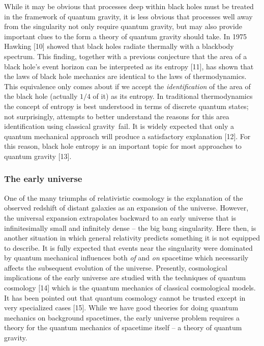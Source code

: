 While it may be obvious that processes deep within black holes must be
treated in the framework of quantum gravity, it is less obvious that
processes well away from the singularity not only require quantum gravity,
but may also provide important clues to the form a theory of quantum gravity
should take. In 1975 Hawking [10] showed that black holes radiate thermally
with a blackbody spectrum. This finding, together with a previous conjecture
that the area of a black hole's event horizon can be interpreted as its
entropy [11], has shown that the laws of black hole mechanics are identical
to the laws of thermodynamics. This equivalence only comes about if we
accept the {\it identification} of the area of the black hole (actually $1/4$
of it) as its entropy. In traditional thermodynamics the concept of entropy
is best understood in terms of discrete quantum states; not surprisingly,
attempts to better understand the reasons for this area identification using
classical gravity{\it \ }fail. It is widely expected that only a quantum
mechanical approach will produce a satisfactory explanation [12]. For this
reason, black hole entropy is an important topic for most approaches to
quantum gravity [13].

\subsubsection{The early universe}

One of the many triumphs of relativistic cosmology is the explanation of the
observed redshift of distant galaxies as an expansion of the universe.
However, the universal expansion extrapolates backward to an early universe
that is infinitesimally small and infinitely dense -- the big bang
singularity. Here then, is another situation in which general relativity
predicts something it is not equipped to describe. It is fully expected that
events near the singularity were dominated by quantum mechanical influences
both {\it of} and {\it on} spacetime which necessarily affects the
subsequent evolution of the universe. Presently, cosmological implications
of the early universe are studied with the techniques of quantum cosmology
[14] which is the quantum mechanics of classical cosmological models. It has
been pointed out that quantum cosmology cannot be trusted except in very
specialized cases [15]. While we have good theories for doing quantum
mechanics on background spacetimes, the early universe problem requires a
theory for the quantum mechanics of spacetime itself -- a theory of quantum
gravity.

